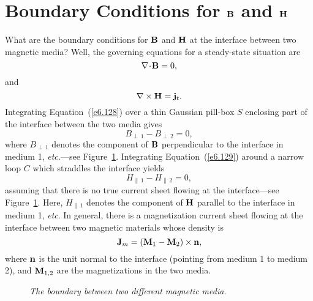 \section{Boundary Conditions for ${\bf B}$ and ${\bf H}$}
What are the boundary conditions for ${\bf B}$ and ${\bf H}$ at
the interface between two magnetic media? Well, the governing equations for a steady-state situation are
\begin{equation}\label{e6.128}
\nabla\!\cdot\!{\bf B} = 0,
\end{equation}
and
\begin{equation}\label{e6.129}
\nabla\times{\bf H} = {\bf j}_t.
\end{equation}
Integrating Equation~(\ref{e6.128}) over a thin Gaussian pill-box $S$ enclosing part of the
interface between the two media gives
\begin{equation}\label{e5.130x}
B_{\perp\,1}-B_{\perp\,2}= 0,
\end{equation}
where $B_{\perp\,1}$ denotes the component of ${\bf B}$ perpendicular to
the interface in medium 1, {\em etc.}---see Figure~\ref{f43b}.
 Integrating Equation~(\ref{e6.129}) around a narrow loop $C$ which
straddles the interface yields
\begin{equation}\label{e5.131x}
H_{\parallel\,1}-H_{\parallel\,2} = 0,
\end{equation}
assuming that there is no true  current sheet flowing at the interface---see Figure~\ref{f43b}.
Here, $H_{\parallel\,1}$ denotes the component of ${\bf H}$ parallel to the
interface in medium 1, {\em etc}.
In general, there is a magnetization current sheet flowing
at the interface between two magnetic materials whose density is 
\begin{equation}
{\bf J}_m= ({\bf M}_{1}-{\bf M}_{2})\times {\bf n},
\end{equation}
where ${\bf n}$ is the unit normal to the interface (pointing from medium 1 to medium 2), and ${\bf M}_{1,2}$ are the magnetizations in the two
media.
\begin{figure}
\epsfysize=1.75in
\centerline{}
\caption{\em The boundary between two different magnetic media.}\label{f43b}
\end{figure}

